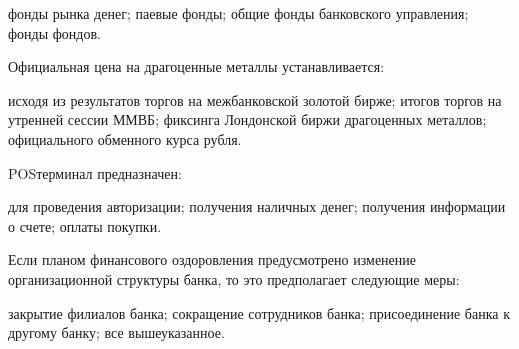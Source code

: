 \documentclass[12pt, table]{exam}
\begin{document}
\begin{questions}
\begin{multicols}{2}
	 \begin{choices}
	 \choice фонды рынка денег;
	 \choice паевые фонды;
	 \CC общие фонды банковского управления;
	 \choice фонды фондов.
	 \end{choices}
\question Официальная цена на драгоценные металлы устанавливается:
	 \begin{choices}
	 \choice исходя из результатов торгов на межбанковской золотой бирже;
	 \choice итогов торгов на утренней сессии ММВБ;
	 \CC фиксинга Лондонской биржи драгоценных металлов;
	 \choice официального обменного курса рубля.
	 \end{choices}
\question POSтерминал предназначен:
	 \begin{choices}
	 \choice для проведения авторизации;
	 \choice получения наличных денег;
	 \choice получения информации о счете;
	 \CC оплаты покупки.
	 \end{choices}
\question Если планом финансового оздоровления предусмотрено изменение организационной структуры банка, то это предполагает следующие меры:
	 \begin{choices}
	 \choice закрытие филиалов банка;
	 \choice сокращение сотрудников банка;
	 \choice присоединение банка к другому банку;
	 \CC все вышеуказанное.
	 \end{choices}



\end{multicols}
\end{questions}
\end{document}
